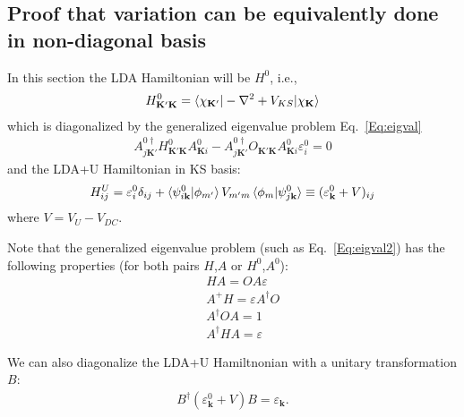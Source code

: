 \documentclass[aps,prb,floatfix,epsfig,singlecolumn,showpacs,preprintnumbers]{revtex4}
\newcommand{\vk}{{\mathbf{k}}}
\newcommand{\vK}{{\mathbf{K}}}
\begin{document}
\subsection{Proof that variation can be equivalently done in non-diagonal basis}

In this section the LDA Hamiltonian will be $H^0$, i.e.,
\begin{eqnarray}
H^0_{\vK'\vK} = \braket{\chi_{\vK'}|-\nabla^2+V_{KS}|\chi_\vK}
\end{eqnarray}
which is diagonalized by the generalized eigenvalue problem Eq.~\ref{Eq:eigval} 
\begin{eqnarray}
A^{0\dagger}_{j\vK'} H^0_{\vK'\vK} A^0_{\vK i} - A^{0\dagger}_{j\vK'} O_{\vK'\vK} A^0_{\vK i} \varepsilon^0_i =0
\label{Eq:eigval2}
\end{eqnarray}
and the LDA+U Hamiltonian in KS basis:
\begin{eqnarray}
H^U_{ij} = \varepsilon^0_i\delta_{ij} +  \braket{\psi^0_{i\vk}|\phi_{m'}}V_{m'm}\braket{\phi_{m}|\psi^0_{j\vk}}\equiv (\varepsilon^0_\vk+V)_{ij}
\end{eqnarray}
where $V =V_U-V_{DC}$.

Note that the generalized eigenvalue problem (such as Eq.~\ref{Eq:eigval2}) has
the following properties (for both pairs $H$,$A$ or $H^0$,$A^0$):
\begin{eqnarray}
&& H A = O A \varepsilon\\
&& A^+ H = \varepsilon A^\dagger O\\
&& A^\dagger O A = 1\\
&& A^\dagger H A = \varepsilon
\end{eqnarray}

We can also diagonalize the LDA+U Hamiltnonian with a unitary
transformation $B$:
\begin{eqnarray}
B^\dagger (\varepsilon^0_\vk+V) B = \varepsilon_\vk.
\end{eqnarray}
\end{document}

